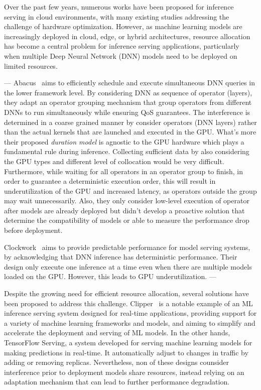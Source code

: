 Over the past few years, numerous works have been proposed for inference serving in cloud environments, with many existing studies addressing the challenge of hardware optimization. However, as machine learning models are increasingly deployed in cloud, edge, or hybrid architectures, resource allocation has become a central problem for inference serving applications, particularly when multiple Deep Neural Network (DNN) models need to be deployed on limited resources.

---
Abacus~ aims to efficiently schedule and execute simultaneous DNN queries in the lower framework level. By considering DNN as sequence of operator (layers), they adapt an operator grouping mechanism that group operators from different DNNs to run simultaneously while ensuring QoS guarantees. The interference is determined in a coarse grained manner by consider operators (DNN layers) rather than the actual kernels that are launched and executed in the GPU. What's more their proposed \textit{duration model} is agnostic to the GPU hardware which plays a fundamental rule during inference. Collecting sufficient data by also considering the GPU types and different level of collocation would be very difficult. Furthermore, while waiting for all operators in an operator group to finish, in order to guarantee a deterministic execution order, this will result in underutilization of the GPU and increased latency, as operators outside the group may wait unnecessarily. Also, they only consider low-level execution of operator after models are already deployed but didn't develop a proactive solution that determine the compatibility of models or able to measure the performance drop before deployment.

Clockwork~ aims to provide predictable performance for model serving systems, by acknowledging that DNN inference has deterministic performance. Their design only execute one inference at a time even when there are multiple models loaded on the GPU. However, this leads to GPU underutilization.
---

Despite the growing need for efficient resource allocation, several solutions have been proposed to address this challenge. Clipper~ is a notable example of an ML inference serving system designed for real-time applications, providing support for a variety of machine learning frameworks and models, and aiming to simplify and accelerate the deployment and serving of ML models. In the other hands, TensorFlow Serving, a system developed for serving machine learning models for making predictions in real-time. It automatically adjust to changes in traffic by adding or removing replicas. Nevertheless, non of these designs counsider interference prior to deployment models share resources, instead relying on an adaptation mechanism that can lead to further performance degradation.

